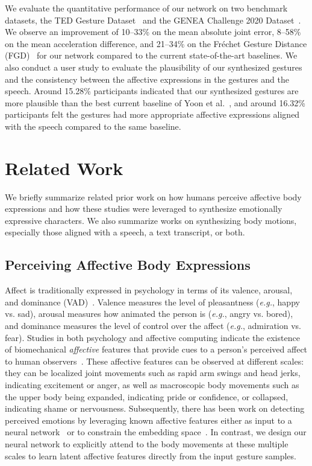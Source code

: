 \documentclass[conference,compsoc]{IEEEtran}
\theoremstyle{definition}
\begin{document}
We evaluate the quantitative performance of our network on two benchmark datasets, the TED Gesture Dataset~\cite{cospeech_gestures} and the GENEA Challenge 2020 Dataset~\cite{genea_2021}. We observe an improvement of 10--33\% on the mean absolute joint error, 8--58\% on the mean acceleration difference, and 21--34\% on the Fr\'echet Gesture Distance (FGD)~\cite{trimodal} for our network compared to the current state-of-the-art baselines. We also conduct a user study to evaluate the plausibility of our synthesized gestures and the consistency between the affective expressions in the gestures and the speech. Around 15.28\% participants indicated that our synthesized gestures are more plausible than the best current baseline of Yoon et al.~\cite{trimodal}, and around 16.32\% participants felt the gestures had more appropriate affective expressions aligned with the speech compared to the same baseline.

\section{Related Work}\label{sec:rw}
We briefly summarize related prior work on how humans perceive affective body expressions and how these studies were leveraged to synthesize emotionally expressive characters. We also summarize works on synthesizing body motions, especially those aligned with a speech, a text transcript, or both.

\subsection{Perceiving Affective Body Expressions}
Affect is traditionally expressed in psychology in terms of its valence, arousal, and dominance (VAD)~\cite{vad}. Valence measures the level of pleasantness (\textit{e.g.}, happy vs. sad), arousal measures how animated the person is (\textit{e.g.}, angry vs. bored), and dominance measures the level of control over the affect (\textit{e.g.}, admiration vs. fear). Studies in both psychology and affective computing indicate the existence of biomechanical \textit{affective} features that provide cues to a person's perceived affect to human observers~\cite{affective_body_survey1,affective_body_survey2,emotion_in_gesture,learning_unseen_emotions,kim2015brvo}. These affective features can be observed at different scales: they can be localized joint movements such as rapid arm swings and head jerks, indicating excitement or anger, as well as macroscopic body movements such as the upper body being expanded, indicating pride or confidence, or collapsed, indicating shame or nervousness. Subsequently, there has been work on detecting perceived emotions by leveraging known affective features either as input to a neural network~\cite{step} or to constrain the embedding space~\cite{taew}. In contrast, we design our neural network to explicitly attend to the body movements at these multiple scales to learn latent affective features directly from the input gesture samples.
\end{document}
